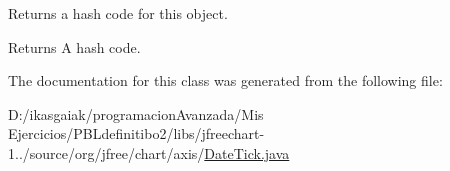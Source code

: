 Returns a hash code for this object.

\begin{DoxyReturn}{Returns}
A hash code. 
\end{DoxyReturn}


The documentation for this class was generated from the following file\+:\begin{DoxyCompactItemize}
\item 
D\+:/ikasgaiak/programacion\+Avanzada/\+Mis Ejercicios/\+P\+B\+Ldefinitibo2/libs/jfreechart-\/1../source/org/jfree/chart/axis/\mbox{\hyperlink{_date_tick_8java}{Date\+Tick.\+java}}\end{DoxyCompactItemize}

